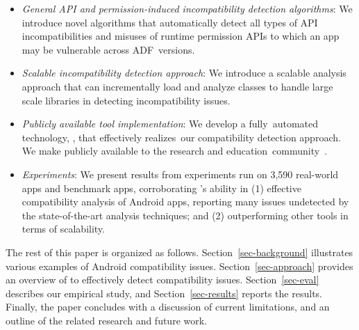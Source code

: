  
\begin{itemize}
\item \textit{General API and permission-induced incompatibility detection algorithms}: We
introduce novel algorithms that automatically detect all types of API incompatibilities and misuses of runtime permission
APIs to which an app may be vulnerable across ADF~versions.


\item \textit{Scalable incompatibility detection approach}:
We introduce a scalable analysis approach that can incrementally
load and analyze classes to handle large scale libraries in 
detecting incompatibility issues. 

\item \textit{Publicly available tool implementation}: We develop a fully~automated
technology, \@approach, that effectively realizes~our
compatibility detection approach. We make \@approach publicly available to the research and education~community~\cite{GainDroid}.



\item \textit{Experiments}: We present results from
experiments run on 3,590 real-world apps and benchmark
apps, corroborating \@approach's ability in (1)
effective compatibility analysis of Android apps,
reporting many issues undetected by the
state-of-the-art analysis techniques; and (2)
outperforming other tools in terms of scalability.

\end{itemize}

The rest of this paper is organized as follows.
Section~\ref{sec-background} illustrates various examples of
Android compatibility issues.  Section~\ref{sec-approach}
provides an overview of \@approach to effectively detect
compatibility issues.  Section~\ref{sec-eval} describes our 
empirical study, and
Section~\ref{sec-results} reports the results. Finally, the
paper concludes with a discussion of %
current limitations, and an outline of the related
research and future work.
 
